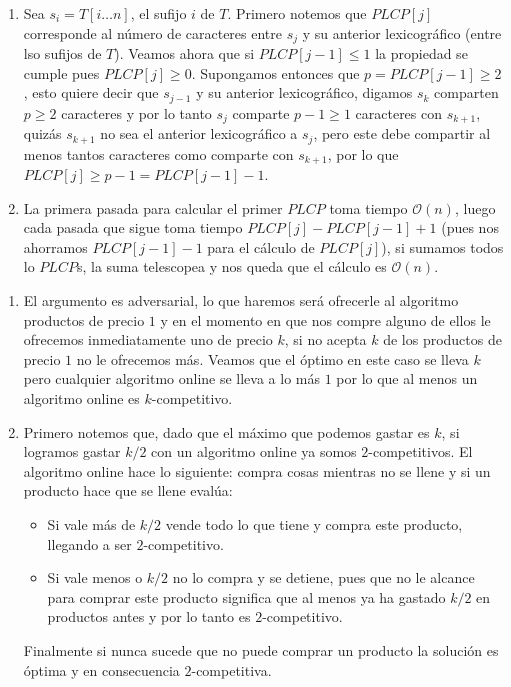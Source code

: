 \documentclass[dcc,uchile]{fcfmcourse}
\theoremstyle{plain}
\theoremstyle{definition}
\begin{document}
\begin{problems}
\begin{enumerate}[1.]
\end{enumerate}
\problem
\begin{enumerate}[1.]
        \item Sea $s_{i} = T[i\ldots n]$, el sufijo $i$ de $T$. Primero notemos que $PLCP[j]$ corresponde al número de caracteres entre $s_{j}$ y su anterior lexicográfico (entre lso sufijos de $T$). Veamos ahora que si $PLCP[j-1]\le 1$ la propiedad se cumple pues $PLCP[j] \ge 0$. Supongamos entonces que $p = PLCP[j-1] \ge 2$, esto quiere decir que $s_{j-1}$ y su anterior lexicográfico, digamos $s_{k}$ comparten $p \ge 2$ caracteres y por lo tanto $s_{j}$ comparte $p-1\ge 1$ caracteres con $s_{k+1}$, quizás $s_{k+1}$ no sea el anterior lexicográfico a $s_{j}$, pero este debe compartir al menos tantos caracteres como comparte con $s_{k+1}$, por lo que $PLCP[j] \ge p - 1 = PLCP[j-1] - 1$.
        \item La primera pasada para calcular el primer $PLCP$ toma tiempo $\mathcal{O}(n)$, luego cada pasada que sigue toma tiempo $PLCP[j]-PLCP[j-1]+1$ (pues nos ahorramos $PLCP[j-1]-1$ para el cálculo de $PLCP[j]$), si sumamos todos lo $PLCP$s, la suma telescopea y nos queda que el cálculo es $\mathcal{O}(n)$.
\end{enumerate}
\problem
\begin{enumerate}[1.]
    \item El argumento es adversarial, lo que haremos será ofrecerle al algoritmo productos de precio $1$ y en el momento en que nos compre alguno de ellos le ofrecemos inmediatamente uno de precio $k$, si no acepta $k$ de los productos de precio $1$ no le ofrecemos más. Veamos que el óptimo en este caso se lleva $k$ pero cualquier algoritmo online se lleva a lo más $1$ por lo que al menos un algoritmo online es $k$-competitivo.
    \item Primero notemos que, dado que el máximo que podemos gastar es $k$, si logramos gastar $k/2$ con un algoritmo online ya somos $2$-competitivos. El algoritmo online hace lo siguiente: compra cosas mientras no se llene y si un producto hace que se llene evalúa:
    \begin{itemize}
        \item Si vale más de $k/2$ vende todo lo que tiene y compra este producto, llegando a ser $2$-competitivo.
        \item Si vale menos o $k/2$ no lo compra y se detiene, pues que no le alcance para comprar este producto significa que al menos ya ha gastado $k/2$ en productos antes y por lo tanto es $2$-competitivo.
    \end{itemize}
    Finalmente si nunca sucede que no puede comprar un producto la solución es óptima y en consecuencia $2$-competitiva.
\end{enumerate}
\end{problems}
\end{document}
